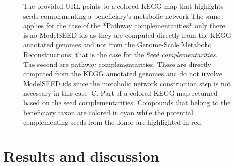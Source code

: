 \documentclass[sn-mathphys,Numbered]{sn-jnl}  %
\theoremstyle{thmstyleone}%
\theoremstyle{thmstyletwo}%
\theoremstyle{thmstylethree}%
\begin{document}
\begin{figure}[H]
{                The provided URL points to a colored KEGG map that highlights seeds complementing a beneficiary's metabolic network
                The same applies for the case of the *Pathway complementarities* only there is no ModelSEED ids as they are computed directly from the KEGG annotated genomes and not from the Genome-Scale Metabolic Reconstructions; that is the case for the \textit{Seed complementarities}.
                The second are pathway complementarities. 
                These are directly computed from the KEGG annotated genomes and do not involve ModelSEED ids since the metabolic network construction step is not necessary in this case.
                C. Part of a colored KEGG map returned based on the seed complementarities. 
                Compounds that belong to the beneficiary taxon are colored in cyan while the potential complementing seeds from the donor are highlighted in red.
            }
            \label{fig:panels}
            \thispagestyle{empty} %
            \nolinenumbers %
        \end{figure}


\newpage

\section*{Results and discussion}
\label{sec:results-and-discussion}

\end{document}
